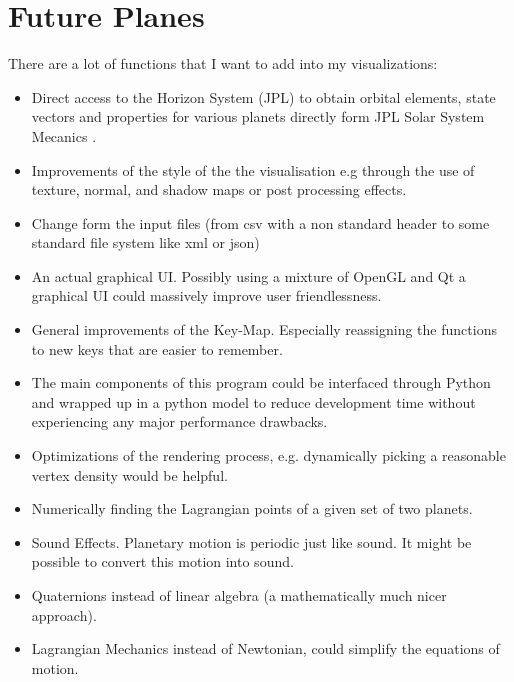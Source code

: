 \documentclass[a4paper,onesided,10pt]{article}
\begin{document}
\section{Future Planes}
There are a lot of functions that I want to add into my visualizations:
\begin{itemize}
	\item Direct access to the Horizon System (JPL) to obtain orbital elements, state vectors and properties for various planets directly form JPL Solar System Mecanics .
	\item Improvements of the style of the the visualisation e.g through the use of texture, normal, and shadow maps or post processing effects.
	\item Change form the input files (from csv with a non standard header to some standard file system like xml or json)
	\item An actual graphical UI. Possibly using a mixture of OpenGL and Qt a graphical UI could massively improve user friendlessness.
	\item General improvements of the Key-Map. Especially reassigning the functions to new keys that are easier to remember.
	\item The main components of this program could be interfaced through Python and wrapped up in a python model to reduce development time without experiencing any major performance drawbacks.
	\item Optimizations of the rendering process, e.g. dynamically picking a reasonable vertex density would be helpful.
	\item Numerically finding the Lagrangian points of a given set of two planets.
	\item Sound Effects. Planetary motion is periodic just like sound. It might be possible to convert this motion into sound.
	\item Quaternions instead of linear algebra (a mathematically much nicer approach).
	\item Lagrangian Mechanics instead of Newtonian, could simplify the equations of motion.
\end{itemize}


\end{document}
